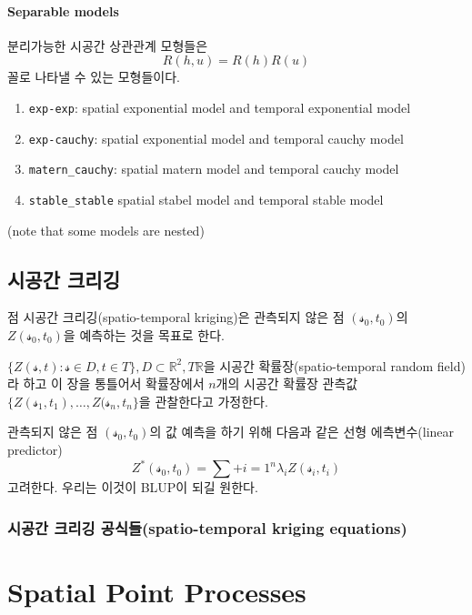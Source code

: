 \documentclass[b5paper,]{scrbook}
\theoremstyle{plain}
\theoremstyle{definition}
\numberwithin{equation}{section}
\begin{document}
\subsection{Separable models}\label{separable-models}

분리가능한 시공간 상관관계 모형들은 \[R(h,u)=R(h)R(u)\] 꼴로 나타낼 수
있는 모형들이다.

\begin{enumerate}
\def\labelenumi{\arabic{enumi}.}
\item
  \texttt{exp-exp}: spatial exponential model and temporal exponential
  model
\item
  \texttt{exp-cauchy}: spatial exponential model and temporal cauchy
  model
\item
  \texttt{matern\_cauchy}: spatial matern model and temporal cauchy
  model
\item
  \texttt{stable\_stable} spatial stabel model and temporal stable model
\end{enumerate}

(note that some models are nested)

\chapter{시공간 크리깅}\label{stkriging}

점 시공간 크리깅(spatio-temporal kriging)은 관측되지 않은 점
\((\mathcal{s}_{0},t_{0})\)의 \(Z(\mathcal{s}_{0},t_{0})\)을 예측하는
것을 목표로 한다.

\(\{ Z(\mathcal{s}, t): \mathcal{s}\in D, t\in T\}, D \subset \mathbb{R}^{2}, T\mathbb{R}\)을
시공간 확률장(spatio-temporal random field)라 하고 이 장을 통틀어서
확률장에서 \(n\)개의 시공간 확률장 관측값
\(\{ Z(\mathcal{s}_{1}, t_{1}), \ldots , Z(\mathcal{s}_{n}, t_{n}\}\)을
관찰한다고 가정한다.

관측되지 않은 점 \((\mathcal{s}_{0},t_{0})\)의 값 예측을 하기 위해
다음과 같은 선형 에측변수(linear predictor)
\[Z^{*}(\mathcal{s}_{0},t_{0})=\sum+{i=1}^{n}\lambda_{i}Z(\mathcal{s}_{i}, t_{i})\]
고려한다. 우리는 이것이 BLUP이 되길 원한다.

\section{시공간 크리깅 공식들(spatio-temporal kriging
equations)}\label{--spatio-temporal-kriging-equations}

\part{Spatial Point
Processes}\label{part-spatial-point-processes}
\end{document}
